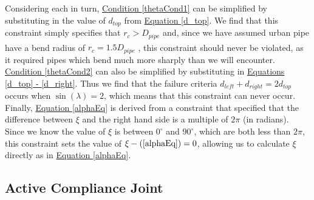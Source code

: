 \documentclass[11pt]{article}		%
\begin{document}
		Considering each in turn, \hyperref[thetaCond1]{Condition \ref*{thetaCond1}} can be simplified by substituting in the value of $d_{top}$ from \hyperref[d_top]{Equation \ref*{d_top}}.
		We find that this constraint simply specifies that $r_c > D_{pipe}$ and, since we have assumed urban pipe have a bend radius of $r_c =  1.5 D_{pipe} $ \textsuperscript{\cite{roh2005differential}}, this constraint should never be violated, as it required pipes which bend much more sharply than we will encounter.
		\\
		\hyperref[thetaCond2]{Condition \ref*{thetaCond2}} can also be simplified by substituting in \hyperref[d_left]{Equations \ref*{d_top} - \ref*{d_right}}. 
		Thus we find that the failure criteria $d_{left} + d_{right} = 2 d_{top}$ occurs when $\sin \left( \lambda \right) = 2$, which means that this constraint can never occur.
		\\
		Finally, \hyperref[alphaEq]{Equation \ref*{alphaEq}} is derived from a constraint that specified that the difference between $\xi$ and the right hand side is a multiple of $2 \pi$ (in radians).
		Since we know the value of $\xi$ is between $0^\circ$ and $90^\circ$, which are both less than $2 \pi$, this constraint sets the value of $\xi - (\ref*{alphaEq}) = 0$, allowing us to calculate $\xi$ directly as in \hyperref[alphaEq]{Equation \ref*{alphaEq}}.
		
		\subsection{Active Compliance Joint}
		
\end{document}
